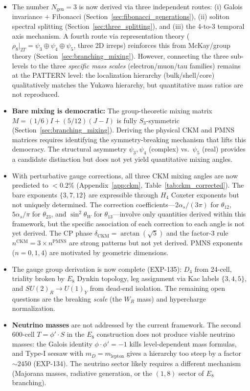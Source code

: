 \documentclass[12pt,a4paper]{article}
\begin{document}
\begin{itemize}
    \item The number $N_{\text{gen}} = 3$ is now derived via three independent routes: (i) Galois invariance $+$ Fibonacci (Section~\ref{sec:fibonacci_generations}), (ii) soliton spectral splitting (Section~\ref{sec:three_splitting}), and (iii) the 4-to-3 temporal axis mechanism. A fourth route via representation theory ($\rho_8|_{2T} = \psi_3 \oplus \psi_4 \oplus \psi_5$, three 2D irreps) reinforces this from McKay/group theory (Section~\ref{sec:branching_mixing}). However, connecting the three sub-levels to the three \emph{specific mass scales} (electron/muon/tau families) remains at the PATTERN level: the localization hierarchy (bulk/shell/core) qualitatively matches the Yukawa hierarchy, but quantitative mass ratios are not reproduced.
    \item \textbf{Bare mixing is democratic:} The group-theoretic mixing matrix $M = (1/6)I + (5/12)(J-I)$ is fully $S_3$-symmetric (Section~\ref{sec:branching_mixing}). Deriving the physical CKM and PMNS matrices requires identifying the symmetry-breaking mechanism that lifts this democracy. The structural asymmetry $\psi_3, \psi_4$ (complex) vs.\ $\psi_5$ (real) provides a candidate distinction but does not yet yield quantitative mixing angles.
    \item With perturbative gauge corrections, all three CKM mixing angles are now predicted to $< 0.2\%$ (Appendix~\ref{app:ckm}, Table~\ref{tab:ckm_corrected}). The bare exponents $\{3, 7, 12\}$ are expressible through $H_4$ Coxeter exponents but not uniquely determined. The correction coefficients---$2\alpha_s/(3\pi)$ for $\theta_{12}$, $5\alpha_s/\pi$ for $\theta_{23}$, and $\sin^2\theta_W$ for $\theta_{13}$---involve only quantities derived within this framework, but the specific association of each correction to each angle is not yet derived. The CP phase $\delta_{\text{CKM}} = \arctan(\sqrt{5})$ and the factor-3 rule $n^{\text{CKM}} = 3 \times n^{\text{PMNS}}$ are strong patterns but not yet derived. PMNS exponents ($n = 0, 1, 4$) are motivated by geometric dimensions.
    \item The gauge group derivation is now complete (EXP-135): $D_4$ from 24-cell, triality broken by $E_8$ Dynkin topology, leg assignment via Kac labels $\{3,4,5\}$, and $SU(2)_R \to U(1)_Y$ from dead-end isolation. The remaining open questions are the breaking \emph{scale} (the $W_R$ mass) and hypercharge normalization.
    \item \textbf{Neutrino masses} are not addressed by the current framework. The second 600-cell $T = \phi' \cdot S$ in the $E_8$ construction does not produce viable neutrino masses: the Galois identity $\phi \cdot \phi' = -1$ kills level-dependent mass formulas, and Type-I seesaw with $m_D = m_{\text{lepton}}$ gives a hierarchy too steep by a factor $\sim 2450$ (EXP-134). The neutrino sector likely requires a different mechanism (Majorana masses, radiative generation, or the $(1,8)$ sector of $E_8$ branching).

\end{itemize}
\end{document}
